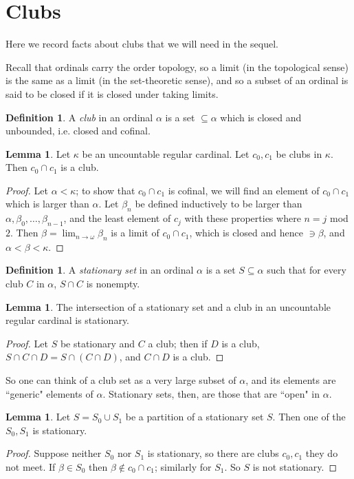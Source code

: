 \documentclass[12pt]{report}
\newcommand{\dfn}[1]{\emph{#1}\index{#1}}
\theoremstyle{definition}
\newtheorem{lemma}[theorem]{Lemma}
\newtheorem{definition}[theorem]{Definition}
\begin{document}
\section{Clubs}
Here we record facts about clubs that we will need in the sequel.

Recall that ordinals carry the order topology, so a limit (in the topological sense) is the same as a limit (in the set-theoretic sense), and so a subset of an ordinal is said to be closed if it is closed under taking limits.
\begin{definition}
A \dfn{club} in an ordinal $\alpha$ is a set $\subseteq \alpha$ which is closed and unbounded, i.e. closed and cofinal.
\end{definition}
\begin{lemma}
Let $\kappa$ be an uncountable regular cardinal. Let $c_0,c_1$ be clubs in $\kappa$. Then $c_0 \cap c_1$ is a club.
\end{lemma}
\begin{proof}
Let $\alpha < \kappa$; to show that $c_0 \cap c_1$ is cofinal, we will find an element of $c_0 \cap c_1$ which is larger than $\alpha$.
Let $\beta_n$ be defined inductively to be larger than $\alpha, \beta_0, \dots, \beta_{n-1}$, and the least element of $c_j$ with these properties where $n = j$ mod $2$.
Then $\beta = \lim_{n \to \omega} \beta_n$ is a limit of $c_0 \cap c_1$, which is closed and hence $\ni \beta$, and $\alpha < \beta < \kappa$.
\end{proof}
\begin{definition}
A \dfn{stationary set} in an ordinal $\alpha$ is a set $S \subseteq \alpha$ such that for every club $C$ in $\alpha$, $S \cap C$ is nonempty.
\end{definition}
\begin{lemma}
The intersection of a stationary set and a club in an uncountable regular cardinal is stationary.
\end{lemma}
\begin{proof}
Let $S$ be stationary and $C$ a club; then if $D$ is a club, $S \cap C \cap D = S \cap (C \cap D)$, and $C \cap D$ is a club.
\end{proof}
So one can think of a club set as a very large subset of $\alpha$, and its elements are ``generic" elements of $\alpha$. Stationary sets, then, are those that are ``open" in $\alpha$.
\begin{lemma}
Let $S = S_0 \cup S_1$ be a partition of a stationary set $S$. Then one of the $S_0,S_1$ is stationary.
\end{lemma}
\begin{proof}
Suppose neither $S_0$ nor $S_1$ is stationary, so there are clubs $c_0,c_1$ they do not meet.
If $\beta \in S_0$ then $\beta \notin c_0 \cap c_1$; similarly for $S_1$. So $S$ is not stationary.
\end{proof}
\end{document}
